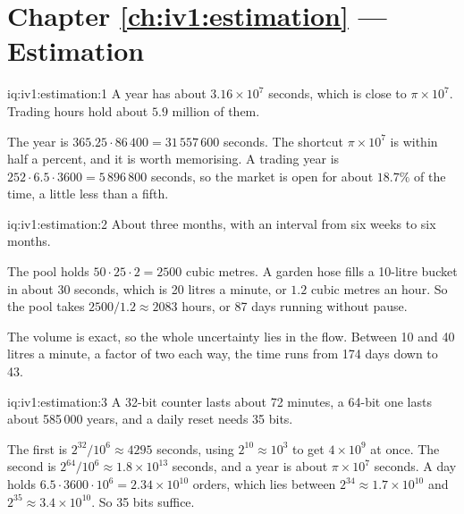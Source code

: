 \section*{Chapter \ref{ch:iv1:estimation} --- Estimation}

\begin{solution}{iq:iv1:estimation:1}
A year has about $3.16 \times 10^7$ seconds, which is close to $\pi \times 10^7$. Trading hours hold about $5.9$ million of them.

The year is $365.25 \cdot 86\,400 = 31\,557\,600$ seconds. The shortcut $\pi \times 10^7$ is within half a percent, and it is worth memorising. A trading year is $252 \cdot 6.5 \cdot 3600 = 5\,896\,800$ seconds, so the market is open for about $18.7\%$ of the time, a little less than a fifth.

\end{solution}

\begin{solution}{iq:iv1:estimation:2}
About three months, with an interval from six weeks to six months.

The pool holds $50 \cdot 25 \cdot 2 = 2500$ cubic metres. A garden hose fills a 10-litre bucket in about 30 seconds, which is 20 litres a minute, or $1.2$ cubic metres an hour. So the pool takes $2500/1.2 \approx 2083$ hours, or 87 days running without pause.

The volume is exact, so the whole uncertainty lies in the flow. Between 10 and 40 litres a minute, a factor of two each way, the time runs from 174 days down to 43.

\end{solution}

\begin{solution}{iq:iv1:estimation:3}
A 32-bit counter lasts about 72 minutes, a 64-bit one lasts about 585\,000 years, and a daily reset needs 35 bits.

The first is $2^{32}/10^6 \approx 4295$ seconds, using $2^{10} \approx 10^3$ to get $4 \times 10^9$ at once. The second is $2^{64}/10^6 \approx 1.8 \times 10^{13}$ seconds, and a year is about $\pi \times 10^7$ seconds. A day holds $6.5 \cdot 3600 \cdot 10^6 = 2.34 \times 10^{10}$ orders, which lies between $2^{34} \approx 1.7 \times 10^{10}$ and $2^{35} \approx 3.4 \times 10^{10}$. So 35 bits suffice.

\end{solution}

